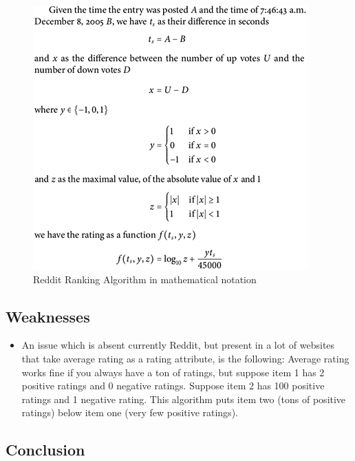 \begin{figure}[!htb]
 \begin{center}
	 \includegraphics{Figures/reddit_rank}
 \end{center}
 \caption{Reddit Ranking Algorithm in mathematical notation}
\end{figure}

\pagebreak

\subsection {Weaknesses}
\begin{itemize}
  \item An issue which is absent currently Reddit, but present in a lot of websites that take average rating as a rating attribute, is the following: Average rating works fine if you always have a ton of ratings, but suppose item 1 has 2 positive ratings and 0 negative ratings. Suppose item 2 has 100 positive ratings and 1 negative rating. This algorithm puts item two (tons of positive ratings) below item one (very few positive ratings).
\end{itemize}

\subsection {Conclusion}

